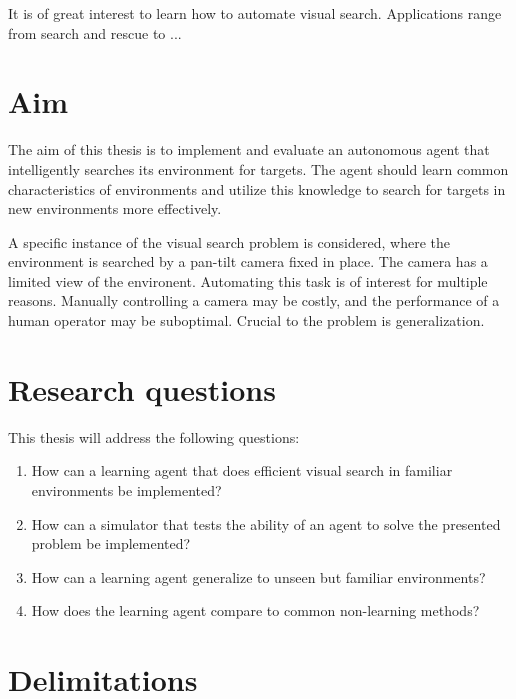 It is of great interest to learn how to automate visual search. Applications range from search and rescue to ...



\section{Aim}
\label{sec:aim}

The aim of this thesis is to implement and evaluate an autonomous agent that intelligently searches its environment for targets. The agent should learn common characteristics of environments and utilize this knowledge to search for targets in new environments more effectively.

A specific instance of the visual search problem is considered, where the environment is searched by a pan-tilt camera fixed in place. The camera has a limited view of the environent. Automating this task is of interest for multiple reasons. Manually controlling a camera may be costly, and the performance of a human operator may be suboptimal. Crucial to the problem is generalization.

\section{Research questions}
\label{sec:research-questions}

This thesis will address the following questions:

\begin{enumerate}
  \item How can a learning agent that does efficient visual search in familiar environments be implemented?
  \item How can a simulator that tests the ability of an agent to solve the presented problem be implemented?
  \item How can a learning agent generalize to unseen but familiar environments?
  \item How does the learning agent compare to common non-learning methods?
\end{enumerate}


\section{Delimitations}
\label{sec:delimitations}

